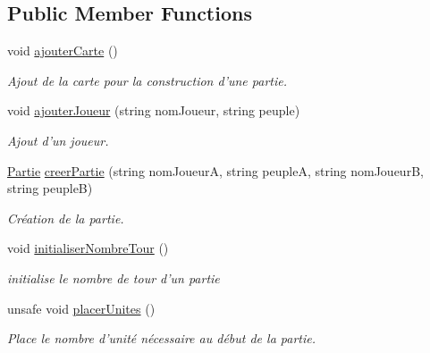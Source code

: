 \subsection*{Public Member Functions}
\begin{DoxyCompactItemize}
\item 
void \hyperlink{class_small_world_1_1_monteur_partie_ad8cedb326193c0f0ff5f2d6705867156}{ajouter\-Carte} ()
\begin{DoxyCompactList}\small\item\em Ajout de la carte pour la construction d'une partie. \end{DoxyCompactList}\item 
void \hyperlink{class_small_world_1_1_monteur_partie_ac1e20f04d1ca796c1aa0ab504ecb1d2a}{ajouter\-Joueur} (string nom\-Joueur, string peuple)
\begin{DoxyCompactList}\small\item\em Ajout d'un joueur. \end{DoxyCompactList}\item 
\hyperlink{class_small_world_1_1_partie}{Partie} \hyperlink{class_small_world_1_1_monteur_partie_a76b953c2a45b0c3355d764355d85e225}{creer\-Partie} (string nom\-Joueur\-A, string peuple\-A, string nom\-Joueur\-B, string peuple\-B)
\begin{DoxyCompactList}\small\item\em Création de la partie. \end{DoxyCompactList}\item 
void \hyperlink{class_small_world_1_1_monteur_partie_a8bfe459f9efcb0561a7612e720e0a373}{initialiser\-Nombre\-Tour} ()
\begin{DoxyCompactList}\small\item\em initialise le nombre de tour d'un partie \end{DoxyCompactList}\item 
unsafe void \hyperlink{class_small_world_1_1_monteur_partie_a5cba1ab3dd04f490331bf22e540cc80e}{placer\-Unites} ()
\begin{DoxyCompactList}\small\item\em Place le nombre d'unité nécessaire au début de la partie. \end{DoxyCompactList}\end{DoxyCompactItemize}
